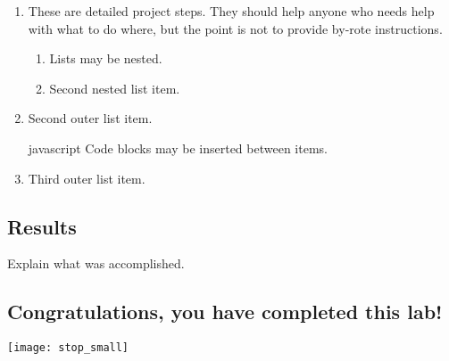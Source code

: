 \documentclass[../workbook]{subfiles}
\begin{document}
\begin{enumerate}
\item These are detailed project steps. They should help anyone who needs help with what to do where, but the point is not to provide by-rote instructions.
    \begin{enumerate}
        \item Lists may be nested.
        \item Second nested list item.
    \end{enumerate}
\item Second outer list item.
\begin{codeblock}{javascript}
Code blocks may be inserted between items.
\end{codeblock}%
\item Third outer list item.
\end{enumerate}



\subsection*{Results}

Explain what was accomplished.



\subsection*{\textbf{Congratulations, you have completed this lab!}}

\texttt{[image: stop\_small]}
\end{document}
